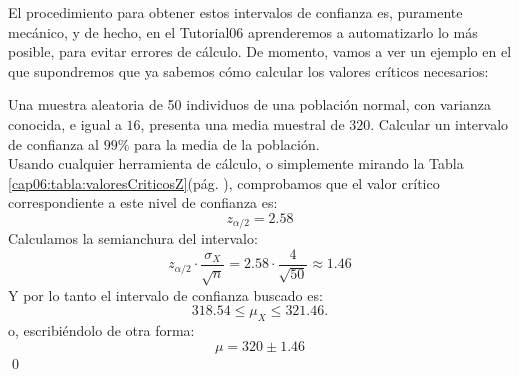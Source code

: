     \begin{center}
    \end{center}
El procedimiento para obtener estos intervalos de confianza es, puramente
mecánico, y de hecho, en el Tutorial06 aprenderemos a automatizarlo lo más
posible, para evitar errores de cálculo. De momento, vamos a ver un ejemplo en
el que supondremos que ya sabemos cómo calcular los valores críticos
necesarios:
\begin{ejemplo}
\label{cap06:ejem:IntConfMediaSigmaConocida}
   Una muestra aleatoria de 50 individuos de una población normal, con varianza conocida, e igual a $16$, presenta una media muestral de $320$. Calcular un intervalo de confianza al $99\%$ para la media de la población.\\
   Usando cualquier herramienta de cálculo, o simplemente mirando la Tabla \ref{cap06:tabla:valoresCriticosZ}(pág. \pageref{cap06:tabla:valoresCriticosZ}), comprobamos que el valor crítico correspondiente a este nivel de confianza es:
   \[z_{\alpha/2}=2.58\]
   Calculamos la semianchura del intervalo:
   \[z_{\alpha/2}\cdot\dfrac{\sigma_X}{\sqrt{n}}=2.58\cdot\dfrac{4}{\sqrt{50}}\approx 1.46\]
   Y por lo tanto el intervalo de confianza buscado es:
   \[318.54\leq \mu_X\leq 321.46.\]
   o, escribiéndolo de otra forma:
   \[\mu=320\pm 1.46\]
   \quad\qed
\end{ejemplo}

